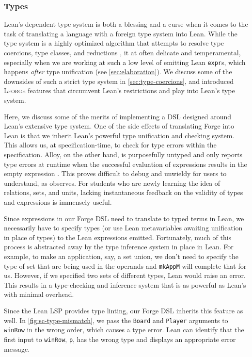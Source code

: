 \subsubsection{Types}

Lean's dependent type system is both a blessing and a curse when it comes to the task of translating a language with a foreign type system into Lean. While the type system is a highly optimized algorithm that attempts to resolve type coercions, type classes, and reductions \cite{de2015lean}, it at often delicate and temperamental, especially when we are working at such a low level of emitting Lean \texttt{expr}s, which happens \emph{after} type unification (see \cref{sec:elaboration}). We discuss some of the downsides of such a strict type system in \cref{sec:type-coercions}, and introduced \textsc{Lforge} features that circumvent Lean's restrictions and play into Lean's type system. 

Here, we discuss some of the merits of implementing a DSL designed around Lean's extensive type system. One of the side effects of translating Forge into Lean is that we inherit Lean's powerful type unification and checking system. This allows us, at specification-time, to check for type errors within the specification. Alloy, on the other hand, is purposefully untyped \cite{jackson2019alloy} and only reports type errors at runtime when the successful evaluation of expressions results in the empty expression \cite{edwards2004type}. This proves difficult to debug and unwieldy for users to understand, as \cite{ngpdbccdlrrvwwk-oopsla-2024} observes. For students who are newly learning the idea of relations, sets, and units, lacking instantaneous feedback on the validity of types and expressions is immensely useful. 

Since expressions in our Forge DSL need to translate to typed terms in Lean, we necessarily have to specify types (or use Lean metavariables awaiting unification in place of types) to the Lean expressions emitted. Fortunately, much of this process is abstracted away by the type inference system in place in Lean. For example, to make an application, say, a set union, we don't need to specify the type of set that are being used in the operands and \texttt{mkAppM} will complete that for us. However, if we specified two sets of different types, Lean would raise an error. This results in a type-checking and inference system that is as powerful as Lean's with minimal overhead. 

Since the Lean LSP provides type linting, our Forge DSL inherits this feature as well. In \cref{fig:sc-type-mismatch}, we pass the \texttt{Board} and \texttt{Player} arguments to \texttt{winRow} in the wrong order, which causes a type error. Lean can identify that the first input to \texttt{winRow}, \texttt{p}, has the wrong type and displays an appropriate error message. 

